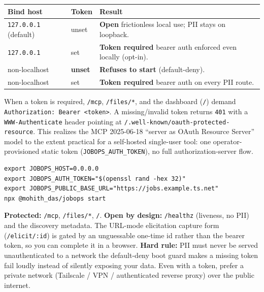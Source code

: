 \documentclass[11pt,letterpaper]{article}
\begin{document}
\begin{center}
\small
\begin{tabularx}{\linewidth}{l l X}
\toprule
\rowcolor{accent!10}\textbf{Bind host} & \textbf{Token} & \textbf{Result} \\
\midrule
\texttt{127.0.0.1} (default) & unset & \textbf{Open} \textemdash{} frictionless local use; PII stays on loopback. \\
\texttt{127.0.0.1}           & set   & \textbf{Token required} \textemdash{} bearer auth enforced even locally (opt-in). \\
non-localhost                & \textbf{unset} & \textbf{Refuses to start} (default-deny). \\
non-localhost                & set   & \textbf{Token required} \textemdash{} bearer auth on every PII route. \\
\bottomrule
\end{tabularx}
\end{center}

When a token is required, \texttt{/mcp}, \texttt{/files/*}, and the dashboard (\texttt{/}) demand \texttt{Authorization:\ Bearer <token>}. A missing/invalid token returns \texttt{401} with a \texttt{WWW-Authenticate} header pointing at \texttt{/.well-known/oauth-protected-resource}. This realizes the MCP 2025-06-18 ``server as OAuth Resource Server'' model to the extent practical for a self-hosted single-user tool: one operator-provisioned static token (\texttt{JOBOPS\_AUTH\_TOKEN}), no full authorization-server flow.

\begin{lstlisting}[language=bashplus]
export JOBOPS_HOST=0.0.0.0
export JOBOPS_AUTH_TOKEN="$(openssl rand -hex 32)"
export JOBOPS_PUBLIC_BASE_URL="https://jobs.example.ts.net"
npx @mohith_das/jobops start
\end{lstlisting}

\textbf{Protected:} \texttt{/mcp}, \texttt{/files/*}, \texttt{/}. \textbf{Open by design:} \texttt{/healthz} (liveness, no PII) and the discovery metadata. The URL-mode elicitation capture form (\texttt{/elicit/:id}) is gated by an unguessable one-time id rather than the bearer token, so you can complete it in a browser. \textbf{Hard rule:} PII must never be served unauthenticated to a network \textemdash{} the default-deny boot guard makes a missing token fail loudly instead of silently exposing your data. Even with a token, prefer a private network (Tailscale / VPN / authenticated reverse proxy) over the public internet.
\end{document}
